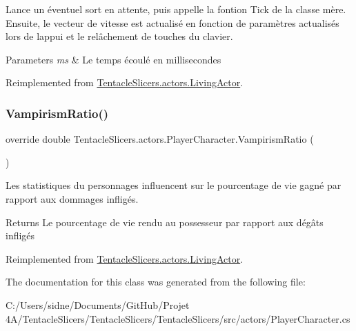 Lance un éventuel sort en attente, puis appelle la fontion Tick de la classe mère. Ensuite, le vecteur de vitesse est actualisé en fonction de paramètres actualisés lors de l\textquotesingle{}appui et le relâchement de touches du clavier. 


\begin{DoxyParams}{Parameters}
{\em ms} & Le temps écoulé en millisecondes \\
\hline
\end{DoxyParams}


Reimplemented from \hyperlink{class_tentacle_slicers_1_1actors_1_1_living_actor_a1697e3d67782b4df99e48a333a138935}{Tentacle\+Slicers.\+actors.\+Living\+Actor}.

\mbox{\label{class_tentacle_slicers_1_1actors_1_1_player_character_acc7326054ba178ac92ff43ed0fbaab2d}} 
\subsubsection{\texorpdfstring{Vampirism\+Ratio()}{VampirismRatio()}}
{\footnotesize\ttfamily override double Tentacle\+Slicers.\+actors.\+Player\+Character.\+Vampirism\+Ratio (\begin{DoxyParamCaption}{ }\end{DoxyParamCaption})\hspace{0.3cm}{\ttfamily [virtual]}}



Les statistiques du personnages influencent sur le pourcentage de vie gagné par rapport aux dommages infligés. 

\begin{DoxyReturn}{Returns}
Le pourcentage de vie rendu au possesseur par rapport aux dégâts infligés 
\end{DoxyReturn}


Reimplemented from \hyperlink{class_tentacle_slicers_1_1actors_1_1_living_actor_a7a3b86dc36055bcbe1838dd3df0c9274}{Tentacle\+Slicers.\+actors.\+Living\+Actor}.



The documentation for this class was generated from the following file\+:\begin{DoxyCompactItemize}
\item 
C\+:/\+Users/sidne/\+Documents/\+Git\+Hub/\+Projet 4\+A/\+Tentacle\+Slicers/\+Tentacle\+Slicers/\+Tentacle\+Slicers/src/actors/Player\+Character.\+cs\end{DoxyCompactItemize}
